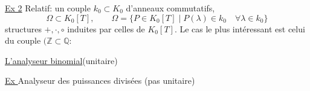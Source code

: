\uline{Ex 2} Relatif: un couple $k_0\subset K_0$ d'anneaux commutatifs,
\[
\Omega\subset K_0[T],\qquad
\Omega=\{P\in K_0[T]\mid P(\lambda)\in k_0\quad\forall\lambda\in k_0\}
\]
structures $+,\cdot,\circ$ induites par celles de $K_0[T]$.
Le cas le plus intéressant est celui du couple $(\mathbb Z\subset\mathbb Q$:

\uline{L'analyseur binomial}\qquad (unitaire)


\uline{Ex }\quad Analyseur des puissances divisées (pas unitaire)
